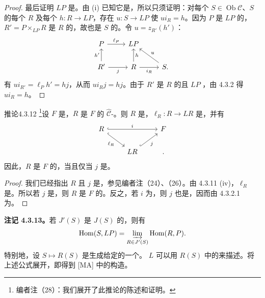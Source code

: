 \begin{proof}
最后证明 $LP$ 是。由 (i) 已知它是，所以只须证明：对每个 $S\in\operatorname{Ob}\mathcal C$、$S$ 的每个 $R$ 及每个 $h:R\to LP$，存在 $u:S\to LP$ 使 $ui_R=h$。因为 $P$ 是 $LP$ 的，$R'=P\times_{LP}R$ 是 $R$ 的，故也是
$S$ 的。令 $u=z_{R'}(h')$：
\[
\begin{tikzcd}
P\arrow[r,"\ell_P"]&LP\\
R'\arrow[u,"h'"]\arrow[r,"j"']&R\arrow[u,"h"']\arrow[r,"i_R"']&S\arrow[ul,"u"'].
\end{tikzcd}
\]
有 $ui_{R'}=\ell_Ph'=hj$，从而 $ui_Rj=hj$。由于 $R'$ 是 $R$ 的且 $LP$ ，由 4.3.2 得 $ui_R=h$。
\end{proof}
\begin{SGAresult}{推论}{4.3.12}
\footnote{编者注（28）：我们展开了此推论的陈述和证明。}设 $F$ 是，$R$ 是 $F$ 的 $\widehat{\mathcal C}$-。则 $R$ 是，$\ell_R:R\to LR$ 是，并有
\[
\begin{tikzcd}
R\arrow[rr,hook,"i"]\arrow[dr,hook,"\ell_R"']&&F\\
&LR\arrow[ur,hook,"j"']&.
\end{tikzcd}
\]
因此，$R$ 是 $F$ 的，当且仅当 $j$ 是。
\end{SGAresult}
\begin{proof}
我们已经指出 $R$ 且 $j$ 是，参见编者注（24）、（26）。由 4.3.11 (iv)，$\ell_R$ 是。所以若 $j$ 是，则 $R$ 是 $F$ 的。反之，若 $i$ 为，则 $j$ 也是，因而由 4.3.2.1 为。
\end{proof}
\textbf{注记 4.3.13。}若 $J'(S)$ 是 $J(S)$ 的，则有
\[
\operatorname{Hom}(S,LP)=\varinjlim_{R\in J'(S)}\operatorname{Hom}(R,P).
\]
特别地，设 $S\mapsto R(S)$ 是生成给定的一个。 $L$ 可以用 $R(S)$ 中的来描述。将上述公式展开，即得到 [MA] 中的构造。

